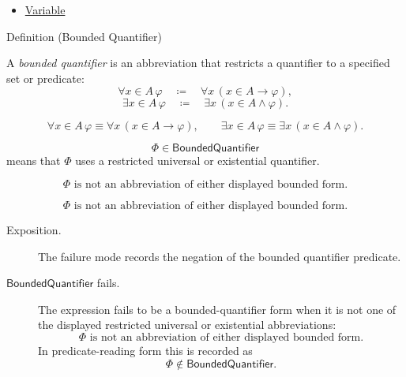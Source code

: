 \begin{dependencies}
\begin{itemize}
  \item \hyperref[def:variable]{Variable}
\end{itemize}
\end{dependencies}

\begin{definitionbox}{Definition (Bounded Quantifier)}
\begin{definition}
\label{def:bounded-q}
A \emph{bounded quantifier} is an abbreviation that restricts a quantifier to a
specified set or predicate:
\[
\forall x\in A\,\varphi
\quad\coloneqq\quad
\forall x\,(x\in A\to\varphi),
\]
\[
\exists x\in A\,\varphi
\quad\coloneqq\quad
\exists x\,(x\in A\land\varphi).
\]
\end{definition}
\end{definitionbox}

\begin{remark*}
\[
\forall x\in A\,\varphi \equiv \forall x\,(x\in A\to\varphi),
\qquad
\exists x\in A\,\varphi \equiv \exists x\,(x\in A\land\varphi).
\]
\end{remark*}

\begin{remark*}
\[
  \Phi\in\mathsf{BoundedQuantifier}
\] means that \(\Phi\) uses a
restricted universal or existential quantifier.
\end{remark*}

\begin{remark*}
\[
\Phi \text{ is not an abbreviation of either displayed bounded form.}
\]
\end{remark*}

\begin{remark*}
\[
  \Phi \text{ is not an abbreviation of either displayed bounded form.}
\]
\end{remark*}

\begin{remark*}
\begin{description}
  \item[Exposition.] The failure mode records the negation of the bounded
  quantifier predicate.
  \item[\(\mathsf{BoundedQuantifier}\) fails.] The expression fails to be a
  bounded-quantifier form when it is not one of the displayed restricted
  universal or existential abbreviations:
  \[
  \Phi \text{ is not an abbreviation of either displayed bounded form.}
  \]
  In predicate-reading form this is recorded as
  \[
  \Phi\notin\mathsf{BoundedQuantifier}.
  \]
\end{description}
\end{remark*}

